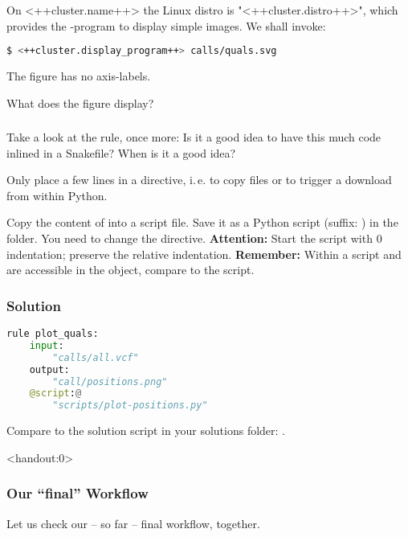 \begin{frame}[fragile]
	\frametitle{}
	On <++cluster.name++> the Linux distro is "<++cluster.distro++>", which \newline provides the -program to display simple images. We shall invoke:
	\begin{lstlisting}[language=Bash, style=Shell]
$ <++cluster.display_program++> calls/quals.svg
	\end{lstlisting}
	The figure has no axis-labels.
	\begin{question}
		What does the figure display?
	\end{question}
\end{frame}

\begin{frame}[fragile]
	\frametitle{}
	\footnotesize
	\begin{question}
		Take a look at the  rule, once more: Is it a good idea to have this much code inlined in a Snakefile? When is it a good idea?
	\end{question}
	\pause
	\begin{docs}
		Only place a few lines in a  directive, i.\,e. to copy files or to trigger a download from within Python.
	\end{docs}
	\pause
	\begin{task}
		Copy the content of  into a script file. Save it as a Python script (suffix: ) in the  folder. You need to change the  directive.\newline
		\textbf{Attention:} Start the script with 0 indentation; preserve the relative indentation.\newline
		\textbf{Remember:} Within a script  and  are accessible in the  object, compare to the  script.
	\end{task}
\end{frame}

\begin{frame}[fragile]
	\frametitle{Solution}
	\begin{lstlisting}[language=Python,style=Python]
rule plot_quals:
    input:
        "calls/all.vcf"
    output:
        "call/positions.png"
    @script:@
        "scripts/plot-positions.py"
	\end{lstlisting}
	Compare to the solution script in your solutions folder: .
\end{frame}

\begin{frame}<handout:0>
	\frametitle{Our ``final'' Workflow}
	Let us check our -- so far -- final workflow, together.
\end{frame}







